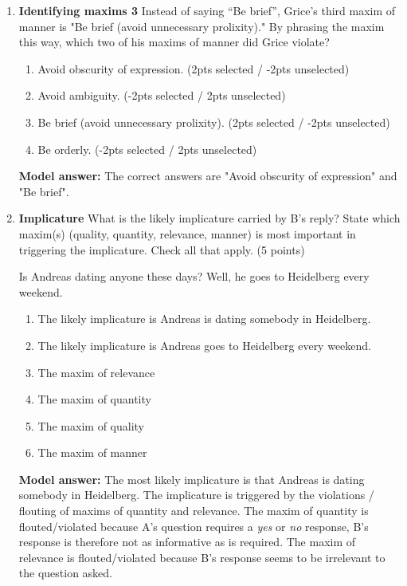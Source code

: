 \documentclass[a4,11pt]{article}
\newcommand{\6}{\mbox{$[\hspace*{-.6mm}[$}}
\newcommand{\9}{\mbox{$]\hspace*{-.6mm}]$}}
\begin{document}
\begin{enumerate}[leftmargin = 12pt]
{ \bf Model answer:} The  correct answer is the maxim of manner, since the contribution is not orderly: you need to open the book to be able to read it.

\item  { \bf Identifying maxims 3}  Instead of saying “Be brief”, Grice's third maxim of manner is "Be brief (avoid unnecessary prolixity)." By phrasing the maxim this way, which two of his maxims of manner did Grice violate?

\begin{enumerate}
\item Avoid obscurity of expression. (2pts selected / -2pts unselected)
\item Avoid ambiguity. (-2pts selected / 2pts unselected)
\item  Be brief (avoid unnecessary prolixity). (2pts selected / -2pts unselected)
\item Be orderly. (-2pts selected / 2pts unselected)
\end{enumerate}

{ \bf Model answer:} The correct answers are "Avoid obscurity of expression" and  "Be brief". 


\item  { \bf Implicature}  What is the likely implicature carried by B's reply? State which maxim(s) (quality, quantity, relevance, manner) is most important in triggering the implicature. Check all that apply. (5 points)

\begin{exe}
 Is Andreas dating anyone these days?
 Well, he goes to Heidelberg every weekend.
\end{exe}

\begin{enumerate}
\item The likely implicature is Andreas is dating somebody in Heidelberg.
\item The likely implicature is Andreas goes to Heidelberg every weekend.
\item The maxim of relevance
\item The maxim of quantity
\item The maxim of  quality
\item The maxim of manner
\end{enumerate}


{ \bf Model answer:} The most likely implicature is that Andreas is dating somebody in Heidelberg. The implicature is triggered by the violations / flouting of maxims of quantity and relevance. The maxim of quantity is flouted/violated because A's question requires a \textit{yes} or \textit{no} response, B's response is therefore not as informative as is required. The maxim of relevance is flouted/violated because B's response seems to be irrelevant to the question asked.



\end{enumerate}
\end{document}
